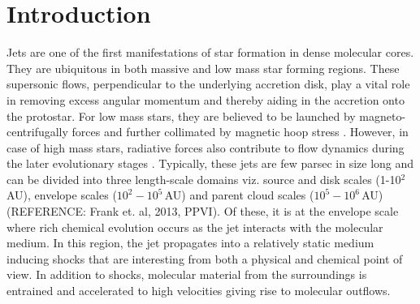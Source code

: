 \documentclass[useAMS,usenatbib]{mn2e}
\newcommand{\refer}{{\color{orange}REFERENCE}}
\begin{document}
%
%


\section{Introduction}
Jets are one of the first manifestations of star
formation in dense molecular cores. They are ubiquitous in both
massive and low mass star forming regions. These supersonic flows,
perpendicular to the underlying accretion disk, play a vital role in
removing excess angular momentum and thereby aiding in the accretion onto the protostar. 
For low mass stars, they are believed to be launched by magneto-centrifugally forces and
further collimated by magnetic hoop stress
\citep[][]{Blandford:1982p892, Konigl:2000p607}. However, in case of
high mass stars, radiative forces also contribute to flow dynamics
during the later evolutionary stages \cite{Vaidya:2011p8992}. 
Typically, these jets are few parsec in size long and can be divided into
three length-scale domains viz. source and disk scales (1-10$^{2}\,$AU),
envelope scales ($10^{2} - 10^{5}$\,AU) and parent cloud scales
($10^{5} - 10^{6}$\,AU) (\refer : Frank et. al, 2013, PPVI). Of these, it is at the envelope scale where rich chemical evolution occurs as the jet interacts
with the molecular medium. In this region, the jet propagates into a
relatively static medium inducing shocks that are interesting from both a
physical and chemical point of view. In addition to shocks, molecular
material from the surroundings is entrained and accelerated to high
velocities giving rise to molecular outflows.
%
\end{document}
